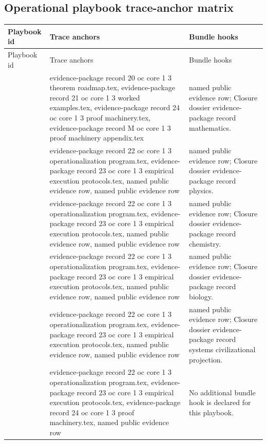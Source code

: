 \subsection{Operational playbook trace-anchor matrix}
\begin{longtable}{@{}L{0.16\textwidth}L{0.38\textwidth}L{0.34\textwidth}@{}}
\toprule
Playbook id & Trace anchors & Bundle hooks \\
\midrule
\endfirsthead
\toprule
Playbook id & Trace anchors & Bundle hooks \\
\midrule
\endhead
{} & evidence-package record 20 oc core 1 3 theorem roadmap.tex, \allowbreak evidence-package record 21 oc core 1 3 worked examples.tex, \allowbreak evidence-package record 24 oc core 1 3 proof machinery.tex, \allowbreak evidence-package record M oc core 1 3 proof machinery appendix.tex & named public evidence row; Closure dossier evidence-package record mathematics. \\
 & evidence-package record 22 oc core 1 3 operationalization program.tex, \allowbreak evidence-package record 23 oc core 1 3 empirical execution protocols.tex, named public evidence row, named public evidence row & named public evidence row; Closure dossier evidence-package record physics. \\
 & evidence-package record 22 oc core 1 3 operationalization program.tex, \allowbreak evidence-package record 23 oc core 1 3 empirical execution protocols.tex, named public evidence row, named public evidence row & named public evidence row; Closure dossier evidence-package record chemistry. \\
 & evidence-package record 22 oc core 1 3 operationalization program.tex, \allowbreak evidence-package record 23 oc core 1 3 empirical execution protocols.tex, named public evidence row, named public evidence row & named public evidence row; Closure dossier evidence-package record biology. \\
 & evidence-package record 22 oc core 1 3 operationalization program.tex, \allowbreak evidence-package record 23 oc core 1 3 empirical execution protocols.tex, named public evidence row, named public evidence row & named public evidence row; Closure dossier evidence-package record systems civilizational projection. \\
 & evidence-package record 22 oc core 1 3 operationalization program.tex, \allowbreak evidence-package record 23 oc core 1 3 empirical execution protocols.tex, \allowbreak evidence-package record 24 oc core 1 3 proof machinery.tex, named public evidence row & No additional bundle hook is declared for this playbook. \\
\bottomrule
\end{longtable}

